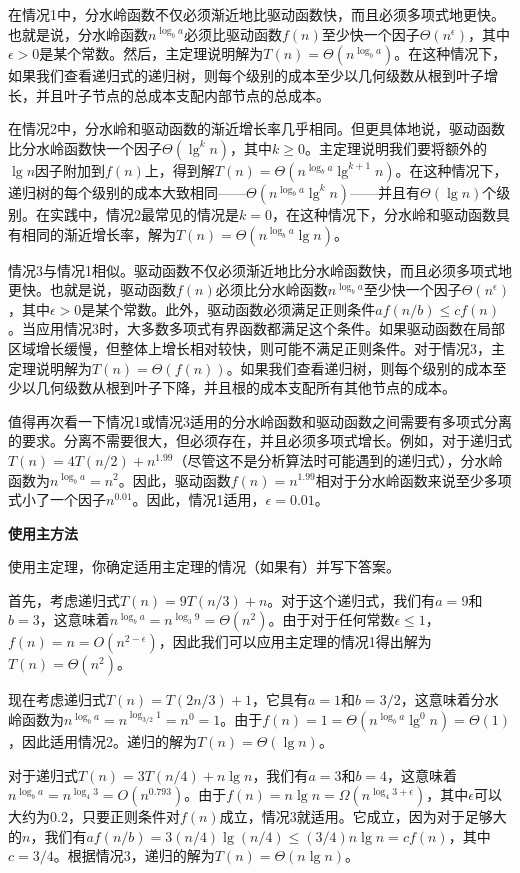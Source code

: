 \documentclass[lang=cn,newtx,10pt,scheme=chinese]{elegantbook}
\begin{document}
在情况1中，分水岭函数不仅必须渐近地比驱动函数快，而且必须多项式地更快。也就是说，分水岭函数$n^{\log _b a}$必须比驱动函数$f(n)$至少快一个因子$\Theta(n^\epsilon)$，其中$\epsilon>0$是某个常数。然后，主定理说明解为$T(n)=\Theta(n^{\log _b a})$。在这种情况下，如果我们查看递归式的递归树，则每个级别的成本至少以几何级数从根到叶子增长，并且叶子节点的总成本支配内部节点的总成本。

在情况2中，分水岭和驱动函数的渐近增长率几乎相同。但更具体地说，驱动函数比分水岭函数快一个因子$\Theta(\lg^kn)$，其中$k \geq 0$。主定理说明我们要将额外的$\lg n$因子附加到$f(n)$上，得到解$T(n)=\Theta(n^{\log _b a} \lg ^{k+1} n)$。在这种情况下，递归树的每个级别的成本大致相同——$\Theta(n^{\log _b a} \lg ^k n)$——并且有$\Theta(\lg n)$个级别。在实践中，情况2最常见的情况是$k=0$，在这种情况下，分水岭和驱动函数具有相同的渐近增长率，解为$T(n)=\Theta(n^{\log _b a} \lg n)$。

情况3与情况1相似。驱动函数不仅必须渐近地比分水岭函数快，而且必须多项式地更快。也就是说，驱动函数$f(n)$必须比分水岭函数$n^{\log _b a}$至少快一个因子$\Theta(n^\epsilon)$，其中$\epsilon>0$是某个常数。此外，驱动函数必须满足正则条件$a f(n / b) \leq c f(n)$。当应用情况3时，大多数多项式有界函数都满足这个条件。如果驱动函数在局部区域增长缓慢，但整体上增长相对较快，则可能不满足正则条件。对于情况3，主定理说明解为$T(n)=\Theta(f(n))$。如果我们查看递归树，则每个级别的成本至少以几何级数从根到叶子下降，并且根的成本支配所有其他节点的成本。

值得再次看一下情况1或情况3适用的分水岭函数和驱动函数之间需要有多项式分离的要求。分离不需要很大，但必须存在，并且必须多项式增长。例如，对于递归式$T(n)=4T(n/2)+n^{1.99}$（尽管这不是分析算法时可能遇到的递归式），分水岭函数为$n^{\log _b a}=n^2$。因此，驱动函数$f(n)=n^{1.99}$相对于分水岭函数来说至少多项式小了一个因子$n^{0.01}$。因此，情况1适用，$\epsilon=0.01$。

\textbf{使用主方法}

使用主定理，你确定适用主定理的情况（如果有）并写下答案。

首先，考虑递归式$T(n)=9T(n/3)+n$。对于这个递归式，我们有$a=9$和$b=3$，这意味着$n^{\log _b a}=n^{\log _3 9}=\Theta(n^2)$。由于对于任何常数$\epsilon \leq 1$，$f(n)=n=O(n^{2-\epsilon})$，因此我们可以应用主定理的情况1得出解为$T(n)=\Theta(n^2)$。

现在考虑递归式$T(n)=T(2n/3)+1$，它具有$a=1$和$b=3/2$，这意味着分水岭函数为$n^{\log _b a}=n^{\log _{3 / 2} 1}=n^0=1$。由于$f(n)=1=\Theta(n^{\log _b a} \lg ^0 n)=\Theta(1)$，因此适用情况2。递归的解为$T(n)=\Theta(\lg n)$。

对于递归式$T(n)=3T(n/4)+n\lg n$，我们有$a=3$和$b=4$，这意味着$n^{\log _b a}=n^{\log _4 3}=O(n^{0.793})$。由于$f(n)=n \lg n=\Omega(n^{\log _4 3+\epsilon})$，其中$\epsilon$可以大约为0.2，只要正则条件对$f(n)$成立，情况3就适用。它成立，因为对于足够大的$n$，我们有$af(n/b)=3(n/4)\lg(n/4)\leq(3/4) n \lg n=c f(n)$，其中$c=3/4$。根据情况3，递归的解为$T(n)=\Theta(n\lg n)$。
\end{document}
